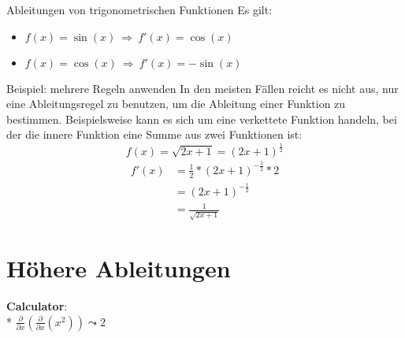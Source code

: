 \begin{bla}{Ableitungen von trigonometrischen Funktionen}
  Es gilt:
  \begin{itemize}
    \item $f(x)=\sin(x)\ \Rightarrow\  f'(x)=\cos(x)$
    \item $f(x)=\cos(x)\ \Rightarrow\ f'(x)=-\sin(x)$
  \end{itemize}
\end{bla}

\begin{bla}{Beispiel: mehrere Regeln anwenden}
  In den meisten Fällen reicht es nicht aus, nur eine Ableitungsregel zu benutzen, um die Ableitung einer Funktion zu bestimmen. Beispielsweise kann es sich um eine verkettete Funktion handeln, bei der die innere Funktion eine Summe aus zwei Funktionen ist: \\
  \begin{equation*}
    f(x)=\sqrt{2x+1}={(2x+1)}^\frac{1}{2}
  \end{equation*}
  \begin{equation*}
  \begin{split}
      f'(x) & = \frac{1}{2}*{(2x+1)}^{-\frac{1}{2}}*2 \\
      & = {(2x+1)}^{-\frac{1}{2}}  \\
      & = \frac{1}{\sqrt{2x+1}}
    \end{split}
  \end{equation*}
\end{bla}

\section{Höhere Ableitungen}
  \begin{marginfigure}
    \begin{tcolorbox}[colback=white!95!black,colframe=white!75!black,title=CAS:,arc=0mm]
      \begin{scriptsize}
        \textbf{Calculator}: \\*
        \hfill \( \tfrac{\partial}{\partial x}\left( \tfrac{\partial}{\partial x}(x^2) \right) \leadsto 2 \)
      \end{scriptsize}
    \end{tcolorbox}
  \end{marginfigure}



